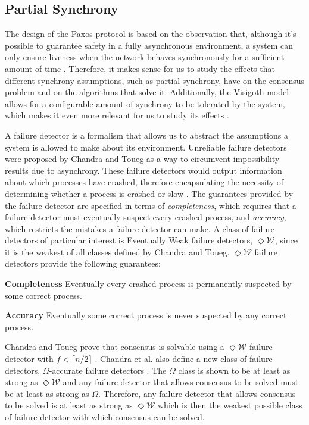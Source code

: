 \documentclass[runningheads,a4paper]{llncs}
\begin{document}
\subsection{Partial Synchrony} \label{Partial Synchrony}
The design of the Paxos protocol is based on the observation that, although it's possible to guarantee safety in a fully asynchronous environment, a system can only ensure liveness when the network behaves synchronously for a sufficient amount of time \cite{Lamport2001}. Therefore, it makes sense for us to study the effects that different synchrony assumptions, such as partial synchrony, have on the consensus problem and on the algorithms that solve it. Additionally, the Visigoth model allows for a configurable amount of synchrony to be tolerated by the system, which makes it even more relevant for us to study its effects \cite{Porto2015}.  \par
A failure detector is a formalism that allows us to abstract the assumptions a system is allowed to make about its environment. Unreliable failure detectors were proposed by Chandra and Toueg as a way to circumvent impossibility results due to asynchrony. These failure detectors would output information about which processes have crashed, therefore encapsulating the necessity of determining whether a process is crashed or slow \cite{DeepakChandra1996}. The guarantees provided by the failure detector are specified in terms of \textit{completeness}, which requires that a failure detector must eventually suspect every crashed process, and \textit{accuracy}, which restricts the mistakes a failure detector can make. A class of failure detectors of particular interest is Eventually Weak failure detectors, $\Diamond\mathcal{W}$, since it is the weakest of all classes defined by Chandra and Toueg. $\Diamond\mathcal{W}$ failure detectors provide the following guarantees:\par
\textbf{Completeness} Eventually every crashed process is permanently suspected by some correct process.\par
\textbf{Accuracy} Eventually some correct process is never suspected by any correct process.\par
Chandra and Toueg prove that consensus is solvable using a $\Diamond\mathcal{W}$ failure detector with $f < \lceil n/2 \rceil$ \cite{DeepakChandra1996}. Chandra et al. also define a new class of failure detectors, $\Omega$-accurate failure detectors \cite{Chandra1996}. The $\Omega$ class is shown to be at least as strong as $\Diamond\mathcal{W}$ and any failure detector that allows consensus to be solved must be at least as strong as $\Omega$. Therefore, any failure detector that allows consensus to be solved is at least as strong as $\Diamond\mathcal{W}$ which is then the weakest possible class of failure detector with which consensus can be solved. \par
\end{document}
